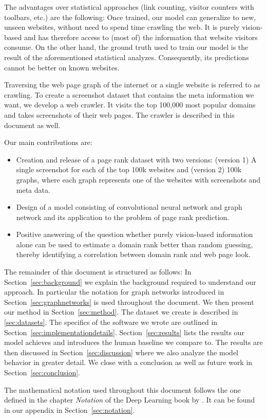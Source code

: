 The advantages over statistical approaches (link counting, visitor counters with toolbars, etc.) are the following: Once trained, our model can generalize to new, unseen websites, without need to spend time crawling the web. It is purely vision-based and has therefore access to (most of) the information that website visitors consume. On the other hand, the ground truth used to train our model is the result of the aforementioned statistical analyzes. Consequently, its  predictions cannot be better on known websites.

Traversing the web page graph of the internet or a single website is referred to as crawling. To create a screenshot dataset that contains the meta information we want, we develop a web crawler. It visits the top 100,000 most popular domains and takes screenshots of their web pages. The crawler is described in this document as well.

Our main contributions are:
\begin{itemize}
\item Creation and release of a page rank dataset with two versions: (version 1) A single screenshot for each of the top 100k websites and (version 2) 100k graphs, where each graph represents one of the websites with screenshots and meta data.
\item Design of a model consisting of convolutional neural network and graph network and its application to the problem of page rank prediction.
\item Positive answering of the question whether purely vision-based information alone can be used to estimate a domain rank better than random guessing, thereby identifying a correlation between domain rank and web page look.
\end{itemize}


The remainder of this document is structured as follows: In Section~\ref{sec:background} we explain the background required to understand our approach. In particular the notation for graph networks introduced in Section~\ref{sec:graphnetworks} is used throughout the document. We then present our method in Section~\ref{sec:method}. The dataset we create is described in \ref{sec:datasets}. The specifics of the software we wrote are outlined in Section~\ref{sec:implementationdetails}. Section~\ref{sec:results} lists the results our model achieves and introduces the human baseline we compare to. The results are then discussed in Section~\ref{sec:discussion} where we also analyze the model behavior in greater detail. We close with a conclusion as well as future work in Section~\ref{sec:conclusion}.

The mathematical notation used throughout this document follows the one defined in the chapter \textit{Notation} of the Deep Learning book by \cite{goodfellow:dlbook}. It can be found in our appendix in Section~\ref{sec:notation}.
